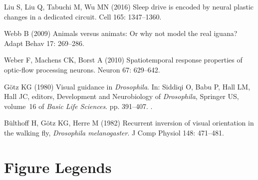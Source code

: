 \begin{thebibliography}{10}
	Liu S, Liu Q, Tabuchi M, Wu MN (2016) Sleep drive is encoded by neural plastic
	changes in a dedicated circuit.
	\newblock Cell 165: 1347--1360.
	
	Webb B (2009) Animals versus animats: {O}r why not model the real iguana?
	\newblock Adapt Behav 17: 269--286.
	
	Weber F, Machens CK, Borst A (2010) Spatiotemporal response properties of
	optic-flow processing neurons.
	\newblock Neuron 67: 629--642.
	
	G{\"{o}}tz KG (1980) Visual guidance in \emph{Drosophila}.
	\newblock In: Siddiqi O, Babu P, Hall LM, Hall JC, editors, Development and
	Neurobiology of \emph{Drosophila}, Springer US, volume~16 of \emph{Basic Life
		Sciences}. pp. 391--407.
	\newblock {}.
	
	B\"{u}lthoff H, G\"{o}tz KG, Herre M (1982) Recurrent inversion of visual
	orientation in the walking fly, \emph{Drosophila melanogaster}.
	\newblock J Comp Physiol 148: 471--481.
	
\end{thebibliography}

\newpage
\section*{Figure Legends}
%

